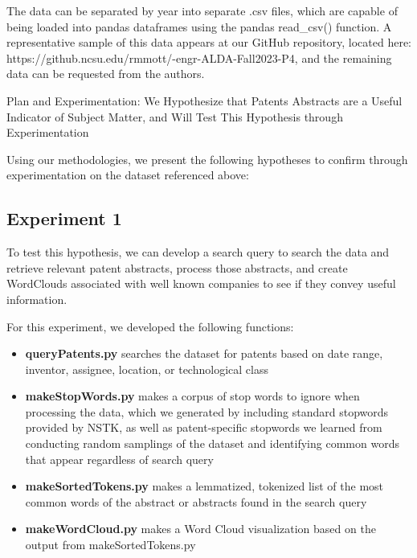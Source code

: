 \documentclass{article}
\begin{document}
The data can be separated by year into separate .csv files, which are capable of being loaded into pandas dataframes using the pandas read\_csv() function.  A representative sample of this data appears at our GitHub repository, located here: https://github.ncsu.edu/rmmott/-engr-ALDA-Fall2023-P4, and the remaining data can be requested from the authors.  

Plan and Experimentation: We Hypothesize that Patents Abstracts are a Useful Indicator of Subject Matter, and Will Test This Hypothesis through Experimentation

Using our methodologies, we present the following hypotheses to confirm through experimentation on the dataset referenced above:

\noindent{}

\subsection{Experiment 1}
To test this hypothesis, we can develop a search query to search the data and retrieve relevant patent abstracts, process those abstracts, and create WordClouds associated with well known companies to see if they convey useful information.

For this experiment, we developed the following functions:
\begin{itemize}
  \item \textbf{queryPatents.py} searches the dataset for patents based on date range, inventor, assignee, location, or technological class
  \item \textbf{makeStopWords.py} makes a corpus of stop words to ignore when processing the data, which we generated by including standard stopwords provided by NSTK, as well as patent-specific stopwords we learned from conducting random samplings of the dataset and identifying common words that appear regardless of search query
  \item \textbf{makeSortedTokens.py} makes a lemmatized, tokenized list of the most common words of the abstract or abstracts found in the search query
  \item \textbf{makeWordCloud.py} makes a Word Cloud visualization based on the output from makeSortedTokens.py
\end{itemize}
\end{document}
